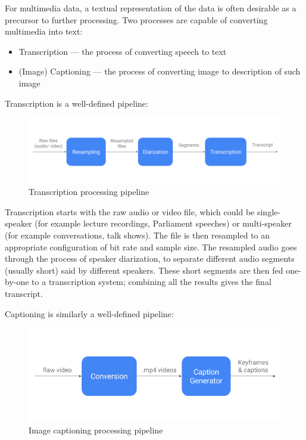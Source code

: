 For multimedia data, a textual representation of the data is often desirable
as a precursor to further processing. Two processes are capable of converting
multimedia into text:

\begin{itemize}
    \item Transcription --- the process of converting speech to
    text~\cite{transcribe-mw}
    \item (Image) Captioning --- the process of converting image to
    description of such image~\cite{caption}
\end{itemize}

Transcription is a well-defined pipeline:

\begin{figure}[h]
\begin{center}
    \includegraphics[width=\textwidth]{../images/pipeline_transcribe.png}
    \caption{Transcription processing pipeline}
\end{center}
\end{figure}

Transcription starts with the raw audio or video file, which could be
single-speaker (for example lecture recordings, Parliament speeches) or
multi-speaker (for example conversations, talk shows). The file is then resampled
to an appropriate configuration of bit rate and sample size. The resampled audio
goes through the process of speaker diarization, to separate different audio
segments (usually short) said by different speakers. These short segments are
then fed one-by-one to a transcription system; combining all the results gives
the final transcript.

Captioning is similarly a well-defined pipeline:

\begin{figure}[h]
\begin{center}
    \includegraphics[width=\textwidth]{../images/pipeline_capgen.png}
    \caption{Image captioning processing pipeline}
\end{center}
\end{figure}


